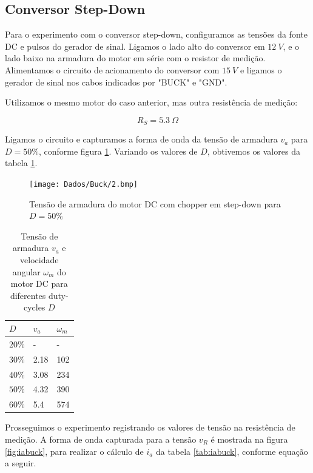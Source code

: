 \documentclass{article}
\begin{document}
\subsection{Conversor Step-Down}
Para o experimento com o conversor step-down, configuramos as tensões da fonte DC e pulsos do gerador de sinal. Ligamos o lado alto do conversor em $12\ V$, e o lado baixo na armadura do motor em série com o resistor de medição. Alimentamos o circuito de acionamento do conversor com $15\ V$ e ligamos o gerador de sinal nos cabos indicados por "BUCK" e "GND".

Utilizamos o mesmo motor do caso anterior, mas outra resistência de medição:

\begin{equation}
R_S=5.3\ \Omega
\end{equation}

Ligamos o circuito e capturamos a forma de onda da tensão de armadura $v_a$ para $D=50\%$, conforme figura \ref{fig:vabuck}. Variando os valores de $D$, obtivemos os valores da tabela \ref{tab:vabuck}.

\begin{figure}[H]
	\centering
	\texttt{[image: Dados/Buck/2.bmp]}
	\caption{Tensão de armadura do motor DC com chopper em step-down para $D=50\%$}
	\label{fig:vabuck}
\end{figure}

\begin{table}[H]
	\centering
	\caption{Tensão de armadura $v_a$ e velocidade angular $\omega_m$ do motor DC para diferentes duty-cycles $D$}
	\label{tab:vabuck}
	\begin{tabular}{|l|l|l|}
		\hline
		$D$    & $v_a$ & $\omega_m$ \\ \hline
		$20\%$ & -     & -          \\ \hline
		$30\%$ & 2.18  & 102        \\ \hline
		$40\%$ & 3.08  & 234        \\ \hline
		$50\%$ & 4.32  & 390        \\ \hline
		$60\%$ & 5.4   & 574        \\ \hline
	\end{tabular}
\end{table}

Prosseguimos o experimento registrando os valores de tensão na resistência de medição. A forma de onda capturada para a tensão $v_R$ é mostrada na figura \ref{fig:iabuck}, para realizar o cálculo de $i_a$ da tabela \ref{tab:iabuck}, conforme equação a seguir.
\end{document}
